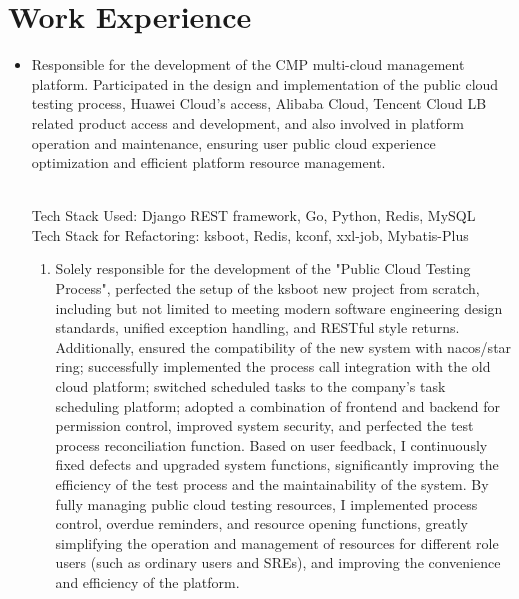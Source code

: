\documentclass{resume}
\newcommand{\en}[1]{#1}
\newcommand{\zh}[1]{}
\begin{document}
\section{\en{Work Experience}\zh{工作经历}}
\en{}
\zh{\datedsubsection{\textbf{\href{https://www.kuaishou.com/about/}{快手，北京}}}{2022/03 -- 至今}}
\en{}
\zh{\rolewithdate{资源管理平台}{后端开发工程师}{2023/07 -- 至今}}
\begin{itemize}
      \item \en{Responsible for the development of the CMP multi-cloud management platform. Participated in the design and implementation of the public cloud testing process, Huawei Cloud's access, Alibaba Cloud, Tencent Cloud LB related product access and development, and also involved in platform operation and maintenance, ensuring user public cloud experience optimization and efficient platform resource management.}
            \zh{负责CMP多云管理平台的研发，期间参与公有云测试流程的设计与实现，华为云的接入，阿里云、腾讯云LB相关产品的接入与研发，同时参与平台运维，确保用户公有云体验优化与平台资源管理高效。}
            \en{\\Tech Stack Used: Django REST framework, Go, Python, Redis, MySQL\\}
            \zh{\\使用的技术栈: Django REST framework, Go, Python, Redis, MySQL\\}
            \en{Tech Stack for Refactoring: ksboot, Redis, kconf, xxl-job, Mybatis-Plus}
            \zh{重构使用的技术栈: ksboot, Redis, kconf, xxl-job, Mybatis-Plus}
            \begin{enumerate}
                  \item \en{Solely responsible for the development of the "Public Cloud Testing Process", perfected the setup of the ksboot new project from scratch, including but not limited to meeting modern software engineering design standards, unified exception handling, and RESTful style returns. Additionally, ensured the compatibility of the new system with nacos/star ring; successfully implemented the process call integration with the old cloud platform; switched scheduled tasks to the company's task scheduling platform; adopted a combination of frontend and backend for permission control, improved system security, and perfected the test process reconciliation function. Based on user feedback, I continuously fixed defects and upgraded system functions, significantly improving the efficiency of the test process and the maintainability of the system. By fully managing public cloud testing resources, I implemented process control, overdue reminders, and resource opening functions, greatly simplifying the operation and management of resources for different role users (such as ordinary users and SREs), and improving the convenience and efficiency of the platform.}

\end{enumerate}
\end{itemize}
\end{document}
